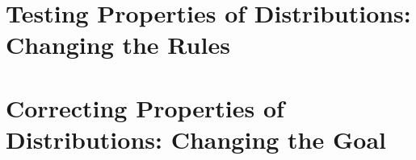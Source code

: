 \documentclass[letterpaper,10pt]{memoir} %
\begin{document}
\chapter{Testing Properties of Distributions: Changing the Rules}


\chapter{Correcting Properties of Distributions: Changing the Goal}




\backmatter
\setlength{\bibitemsep}{\baselineskip} %
\SingleSpacing %
\printbibliography %
\end{document}

